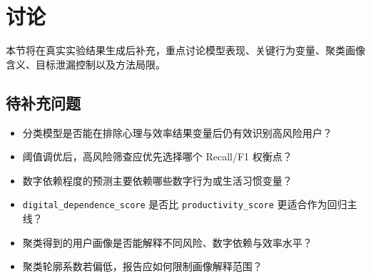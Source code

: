 \section{讨论}

本节将在真实实验结果生成后补充，重点讨论模型表现、关键行为变量、聚类画像含义、目标泄漏控制以及方法局限。

\subsection{待补充问题}

\begin{itemize}
  \item 分类模型是否能在排除心理与效率结果变量后仍有效识别高风险用户？
  \item 阈值调优后，高风险筛查应优先选择哪个 Recall/F1 权衡点？
  \item 数字依赖程度的预测主要依赖哪些数字行为或生活习惯变量？
  \item \texttt{digital\_dependence\_score} 是否比 \texttt{productivity\_score} 更适合作为回归主线？
  \item 聚类得到的用户画像是否能解释不同风险、数字依赖与效率水平？
  \item 聚类轮廓系数若偏低，报告应如何限制画像解释范围？
\end{itemize}
